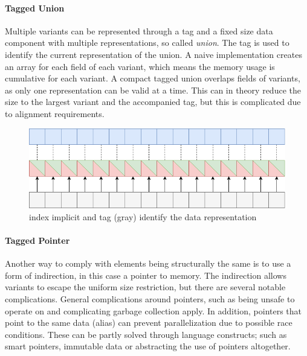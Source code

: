 \documentclass{article}
\begin{document}
\paragraph{Tagged Union}

Multiple variants can be represented through a tag and a fixed size data component with multiple representations, so called {\it union}.
The tag is used to identify the current representation of the union. 
A naive implementation creates an array for each field of each variant, which means the memory usage is cumulative for each variant. 
A compact tagged union overlaps fields of variants, as only one representation can be valid at a time.
This can in theory reduce the size to the largest variant and the accompanied tag, but this is complicated due to alignment requirements\cite{accelerate-sum-types}.

\begin{figure}[ht]
    \centering
    \includegraphics[scale=0.4]{taggedunion}
    \caption{ index implicit and tag (gray) identify the data representation }
\end{figure}

\newpage

\paragraph{Tagged Pointer}

Another way to comply with elements being structurally the same is to use a form of indirection, in this case a pointer to memory.
The indirection allows variants to escape the uniform size restriction, but there are several notable complications.
General complications around pointers, such as being unsafe to operate on and complicating garbage collection apply.
In addition, pointers that point to the same data (alias) can prevent parallelization due to possible race conditions.
These can be partly solved through language constructs; such as smart pointers, immutable data or abstracting the use of pointers altogether.
\end{document}
